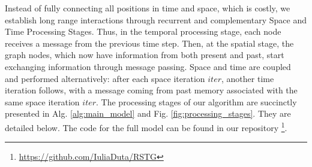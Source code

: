 \documentclass{article}
\begin{document}
Instead of fully connecting all positions in time and space, which is costly, we establish long range interactions through recurrent and complementary Space and Time Processing Stages. Thus, in the temporal processing stage, each node receives a message from the previous time step. Then, at the spatial stage, the graph nodes, which now have information from both present and past, start exchanging information through message passing.  Space and time are coupled and performed alternatively: after each space iteration $iter$, another time iteration follows, with a message coming from past memory associated with the same space iteration $iter$. The processing stages of our algorithm are succinctly presented in Alg. \ref{alg:main_model} and Fig. \ref{fig:processing_stages}. They are detailed below. The code for the full model can be found in our repository \footnote{\url{https://github.com/IuliaDuta/RSTG}}.
\end{document}
